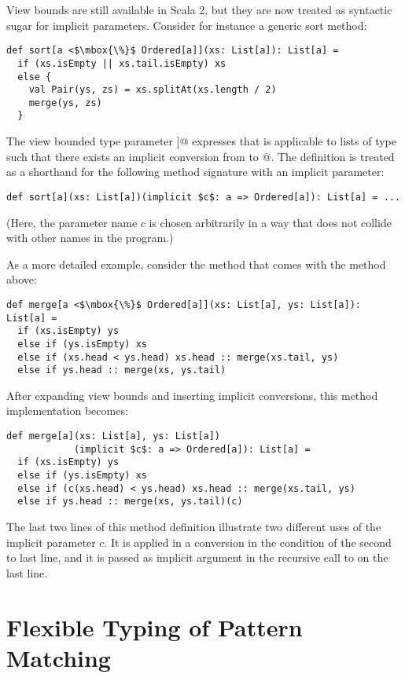 \documentclass[a4paper,11pt,twoside]{article}
\begin{document}
View bounds are still available in Scala 2, but they are now treated as
syntactic sugar for implicit parameters. Consider for instance 
a generic sort method:
\begin{lstlisting}
def sort[a <$\mbox{\%}$ Ordered[a]](xs: List[a]): List[a] = 
  if (xs.isEmpty || xs.tail.isEmpty) xs
  else {
    val Pair(ys, zs) = xs.splitAt(xs.length / 2)
    merge(ys, zs)
  }
\end{lstlisting}
The view bounded type parameter \lstinline@[a <$\mbox{\%}$ Ordered[a]]@
expresses that \lstinline@sort@ is applicable to lists of type
\lstinline@a@ such that there exists an implicit conversion from
\lstinline@a@ to \lstinline@Ordered[a]@. The definition is treated as
a shorthand for the following method signature with an implicit
parameter:
\begin{lstlisting}
def sort[a](xs: List[a])(implicit $c$: a => Ordered[a]): List[a] = ...
\end{lstlisting}
(Here, the parameter name $c$ is chosen arbitrarily in a way
that does not collide with other names in the program.)

As a more detailed example, consider the \lstinline@merge@ method that
comes with the \lstinline@sort@ method above:
\begin{lstlisting}
def merge[a <$\mbox{\%}$ Ordered[a]](xs: List[a], ys: List[a]): List[a] =
  if (xs.isEmpty) ys
  else if (ys.isEmpty) xs
  else if (xs.head < ys.head) xs.head :: merge(xs.tail, ys)
  else if ys.head :: merge(xs, ys.tail)
\end{lstlisting}
After expanding view bounds and inserting implicit conversions, this
method implementation becomes:
\begin{lstlisting}
def merge[a](xs: List[a], ys: List[a])
            (implicit $c$: a => Ordered[a]): List[a] =
  if (xs.isEmpty) ys
  else if (ys.isEmpty) xs
  else if (c(xs.head) < ys.head) xs.head :: merge(xs.tail, ys)
  else if ys.head :: merge(xs, ys.tail)(c)
\end{lstlisting}
The last two lines of this method definition illustrate two different
uses of the implicit parameter $c$. It is applied in a conversion in
the condition of the second to last line, and it is passed as implicit
argument in the recursive call to \lstinline@merge@ on the last line.

\section{Flexible Typing of Pattern Matching}\label{gadts}
\end{document}
